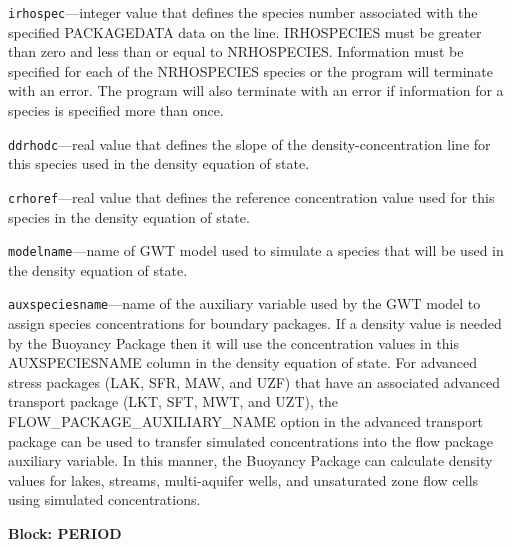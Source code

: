 \begin{description}
\item \texttt{irhospec}---integer value that defines the species number associated with the specified PACKAGEDATA data on the line. IRHOSPECIES must be greater than zero and less than or equal to NRHOSPECIES. Information must be specified for each of the NRHOSPECIES species or the program will terminate with an error.  The program will also terminate with an error if information for a species is specified more than once.

\item \texttt{ddrhodc}---real value that defines the slope of the density-concentration line for this species used in the density equation of state.

\item \texttt{crhoref}---real value that defines the reference concentration value used for this species in the density equation of state.

\item \texttt{modelname}---name of GWT model used to simulate a species that will be used in the density equation of state.

\item \texttt{auxspeciesname}---name of the auxiliary variable used by the GWT model to assign species concentrations for boundary packages.  If a density value is needed by the Buoyancy Package then it will use the concentration values in this AUXSPECIESNAME column in the density equation of state.  For advanced stress packages (LAK, SFR, MAW, and UZF) that have an associated advanced transport package (LKT, SFT, MWT, and UZT), the FLOW\_PACKAGE\_AUXILIARY\_NAME option in the advanced transport package can be used to transfer simulated concentrations into the flow package auxiliary variable.  In this manner, the Buoyancy Package can calculate density values for lakes, streams, multi-aquifer wells, and unsaturated zone flow cells using simulated concentrations.

\end{description}
\item \textbf{Block: PERIOD}

